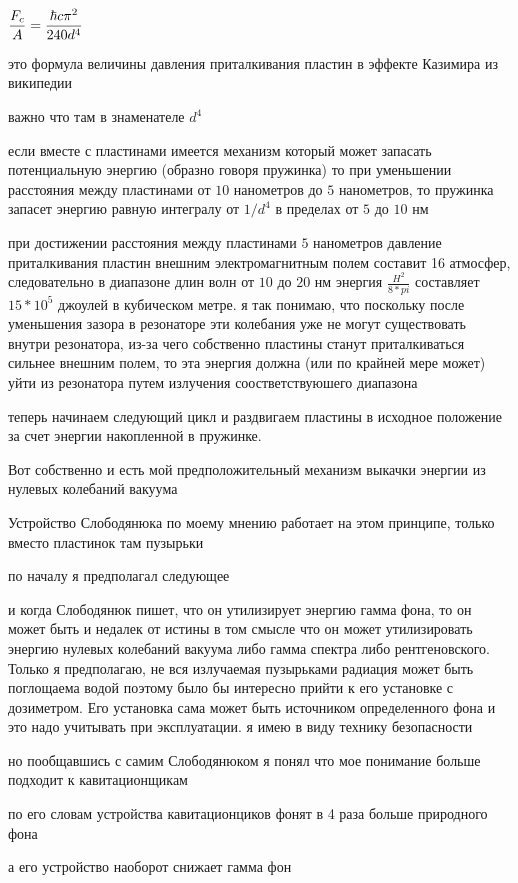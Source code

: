 \documentclass[12pt, letterpaper]{article}
\begin{document}
$\displaystyle {F_{c} \over A}={\hbar c\pi ^{2} \over 240d^{4}}$

это формула величины давления приталкивания  пластин в эффекте Казимира из википедии

важно что там в знаменателе $d^4$

если вместе с пластинами имеется механизм который может запасать потенциальную энергию (образно говоря пружинка) то при уменьшении расстояния между пластинами от $10$ нанометров до $5$ нанометров, то пружинка запасет энергию равную интегралу от $1/d^4$ в пределах от $5$ до $10$ нм

при достижении расстояния между пластинами $5$ нанометров давление приталкивания пластин внешним электромагнитным полем составит 16 атмосфер, следовательно в диапазоне длин волн от $10$ до $20$ нм энергия $\frac{H^2}{8*pi}$ составляет $15 * 10^5$ джоулей в кубическом метре. я так понимаю, что поскольку после уменьшения зазора в резонаторе эти колебания уже не могут существовать внутри резонатора, из-за чего собственно пластины станут приталкиваться сильнее внешним полем, то эта энергия должна (или по крайней мере может) уйти из резонатора путем излучения соостветствуюшего диапазона


теперь начинаем следующий цикл и раздвигаем пластины в исходное положение за счет энергии накопленной в пружинке.

Вот собственно и есть мой предположительный механизм выкачки энергии из нулевых колебаний вакуума


Устройство Слободянюка по моему мнению работает на этом принципе, только вместо пластинок там пузырьки

по началу я предполагал следующее

и когда Слободянюк пишет, что он утилизирует энергию гамма фона, то он может быть и недалек от истины в том смысле что он может утилизировать энергию нулевых колебаний вакуума либо гамма спектра либо рентгеновского. Только я предполагаю, не вся излучаемая пузырьками радиация может быть поглощаема водой поэтому было бы интересно прийти к его установке с дозиметром. Его установка сама может быть источником определенного фона и это надо учитывать при эксплуатации. я имею в виду технику безопасности

но пообщавшись с самим Слободянюком я понял что мое понимание больше подходит к кавитационщикам

по его словам устройства кавитационциков фонят в 4 раза больше природного фона

а его устройство наоборот снижает гамма фон
\end{document}
